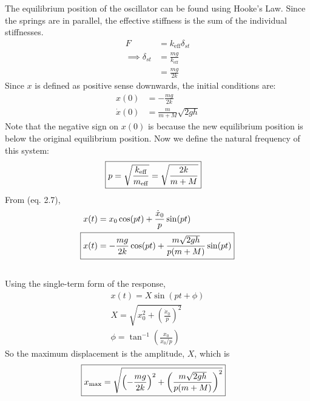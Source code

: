 The equilibrium position of the oscillator can be found using Hooke's Law. Since the springs are in parallel, the effective stiffness is the sum of the individual stiffnesses.
\begin{align*}
    F &= k_{\text{eff}} \delta_{st} \\
    \implies \delta_{st} &= \frac{mg}{k_{\text{eff}}} \\
    &= \frac{mg}{2k}
\end{align*}
Since $x$ is defined as positive sense downwards, the initial conditions are:
\begin{align*}
    x(0) &= -\frac{mg}{2k} \\
    \dot{x}(0) &= \frac{m}{m + M} \sqrt{2 g h}
\end{align*}
Note that the negative sign on $x(0)$ is because the new equilibrium position is below the original equilibrium position. Now we define the natural frequency of this system:
\begin{align*}
    \Aboxed{p = \sqrt{\frac{k_{\text{eff}}}{m_{\text{eff}}}} = \sqrt{\frac{2k}{m + M}}}
\end{align*}
From (eq. 2.7), 
\begin{align*}
    x(t) &= x_0 \cos (pt) + \frac{\dot{x}_0}{p} \sin (pt) \\
    \Aboxed{x(t) &= -\frac{mg}{2k} \cos (pt) + \frac{m\sqrt{2gh}}{p(m + M)} \sin (pt)}
\end{align*}

\subsection{}
Using the single-term form of the response, 
\begin{gather*}
    x(t) = X \sin (pt + \phi) \\
    X = \sqrt{x_0^2 + \left(\frac{\dot{x}_0}{p}\right)^2} \\
    \phi = \tan^{-1} \left(\frac{x_0}{\dot{x}_0 / p}\right)
\end{gather*}
So the maximum displacement is the amplitude, $X$, which is
\begin{align*}
    \Aboxed{x_{\text{max}} &= \sqrt{\left(-\frac{mg}{2k}\right)^2 + \left(\frac{m\sqrt{2gh}}{p(m + M)}\right)^2}}
\end{align*}
